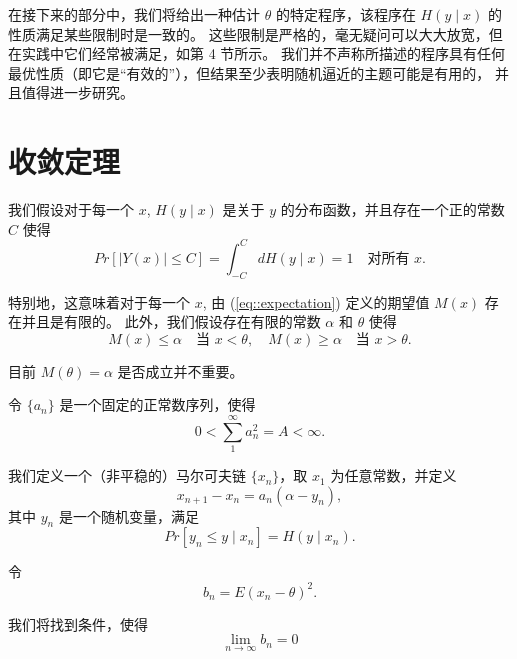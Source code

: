 \documentclass{article}
\begin{document}
在接下来的部分中，我们将给出一种估计 $\theta$ 的特定程序，该程序在 $H(y \mid x)$ 的性质满足某些限制时是一致的。
这些限制是严格的，毫无疑问可以大大放宽，但在实践中它们经常被满足，如第 4 节所示。
我们并不声称所描述的程序具有任何最优性质（即它是``有效的''），但结果至少表明随机逼近的主题可能是有用的，
并且值得进一步研究。

\section{收敛定理}
\label{sec::convergence_theorem}

我们假设对于每一个 $x$, $H(y \mid x)$ 是关于 $y$ 的分布函数，并且存在一个正的常数 $C$ 使得
\begin{equation}
    \label{eq::bounded}
    Pr[|Y(x)| \leq C] = \int_{-C}^{C} dH(y \mid x) = 1 \quad \text{对所有 } x.
\end{equation}

特别地，这意味着对于每一个 $x$, 由 (\ref{eq::expectation}) 定义的期望值 $M(x)$ 存在并且是有限的。
此外，我们假设存在有限的常数 $\alpha$ 和 $\theta$ 使得
\begin{equation}
    \label{eq::monotonic}
    M(x) \leq \alpha \quad \text{当 } x < \theta, \quad M(x) \geq \alpha \quad \text{当 } x > \theta.
\end{equation}

目前 $M(\theta) = \alpha$ 是否成立并不重要。

令 $\{a_n\}$ 是一个固定的正常数序列，使得
\begin{equation}
    \label{eq::series_convergence}
    0 < \sum_{1}^{\infty} a_n^2 = A < \infty.
\end{equation}

我们定义一个（非平稳的）马尔可夫链 $\{x_n\}$，取 $x_1$ 为任意常数，并定义
\begin{equation}
    \label{eq::markov_chain}
    x_{n+1} - x_n = a_n (\alpha - y_n),
\end{equation}
其中 $y_n$ 是一个随机变量，满足
\begin{equation}
    Pr[y_n \leq y \mid x_n] = H(y \mid x_n).
\end{equation}

令
\begin{equation}
    b_n = E(x_n - \theta)^2.
\end{equation}

我们将找到条件，使得
\begin{equation}
    \label{eq::convergence}
    \lim_{n \to \infty} b_n = 0
\end{equation}
\end{document}
